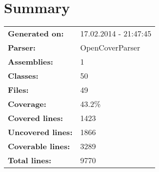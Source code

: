 \documentclass[a4paper,10pt]{article}
\begin{document}
\setcounter{secnumdepth}{-1}
\section{Summary}
\begin{longtable}[l]{ll}
\textbf{Generated on:} & 17.02.2014 - 21:47:45\\
\textbf{Parser:} & OpenCoverParser\\
\textbf{Assemblies:} & 1\\
\textbf{Classes:} & 50\\
\textbf{Files:} & 49\\
\textbf{Coverage:} & 43.2\%\\
\textbf{Covered lines:} & 1423\\
\textbf{Uncovered lines:} & 1866\\
\textbf{Coverable lines:} & 3289\\
\textbf{Total lines:} & 9770\\
\end{longtable}
\end{document}
